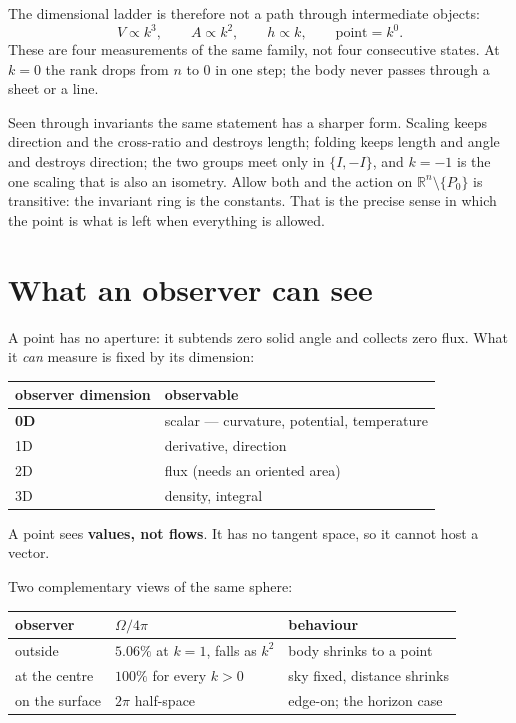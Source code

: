 \documentclass[11pt,fleqn]{article}
\begin{document}
The dimensional ladder is therefore not a path through intermediate objects:
\begin{equation}
V \propto k^3, \qquad A \propto k^2, \qquad h \propto k, \qquad \text{point} = k^0.
\end{equation}
These are four measurements of the same family, not four consecutive states. At $k = 0$ the rank
drops from $n$ to $0$ in one step; the body never passes through a sheet or a line.

Seen through invariants the same statement has a sharper form. Scaling keeps direction and the
cross-ratio and destroys length; folding keeps length and angle and destroys direction; the two
groups meet only in $\{I, -I\}$, and $k = -1$ is the one scaling that is also an isometry. Allow both
and the action on $\mathbb{R}^n \setminus \{P_0\}$ is transitive: the invariant ring is the constants.
That is the precise sense in which the point is what is left when everything is allowed.

\section{What an observer can see}

A point has no aperture: it subtends zero solid angle and collects zero flux. What it \emph{can}
measure is fixed by its dimension:

\begin{table}[H]
\centering
\begin{tabular}{@{}ll@{}}
\toprule
observer dimension & observable \\
\midrule
\textbf{0D} & scalar --- curvature, potential, temperature \\
1D & derivative, direction \\
2D & flux (needs an oriented area) \\
3D & density, integral \\
\bottomrule
\end{tabular}
\end{table}

A point sees \textbf{values, not flows}. It has no tangent space, so it cannot host a vector.

Two complementary views of the same sphere:

\begin{table}[H]
\centering
\small
\begin{tabular}{@{}llp{5.2cm}@{}}
\toprule
observer & $\Omega/4\pi$ & behaviour \\
\midrule
outside & $5.06\%$ at $k=1$, falls as $k^2$ & body shrinks to a point \\
at the centre & $100\%$ for every $k > 0$ & sky fixed, distance shrinks \\
on the surface & $2\pi$ half-space & edge-on; the horizon case \\
\bottomrule
\end{tabular}
\end{table}
\end{document}
